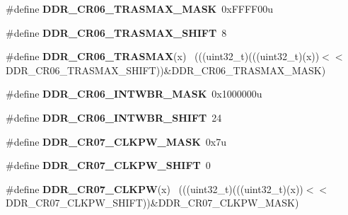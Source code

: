 \begin{DoxyCompactItemize}
\item 
\hypertarget{group___d_d_r___register___masks_ga39b9c655120cbb895150eb805896a00d}{}\#define {\bfseries D\+D\+R\+\_\+\+C\+R06\+\_\+\+T\+R\+A\+S\+M\+A\+X\+\_\+\+M\+A\+S\+K}~0x\+F\+F\+F\+F00u\label{group___d_d_r___register___masks_ga39b9c655120cbb895150eb805896a00d}

\item 
\hypertarget{group___d_d_r___register___masks_gac6c0a9be33d08dc2519b8b05fae15c8c}{}\#define {\bfseries D\+D\+R\+\_\+\+C\+R06\+\_\+\+T\+R\+A\+S\+M\+A\+X\+\_\+\+S\+H\+I\+F\+T}~8\label{group___d_d_r___register___masks_gac6c0a9be33d08dc2519b8b05fae15c8c}

\item 
\hypertarget{group___d_d_r___register___masks_gae784e3f9d431535c49759d16ac72547b}{}\#define {\bfseries D\+D\+R\+\_\+\+C\+R06\+\_\+\+T\+R\+A\+S\+M\+A\+X}(x)                                        ~(((uint32\+\_\+t)(((uint32\+\_\+t)(x))$<$$<$D\+D\+R\+\_\+\+C\+R06\+\_\+\+T\+R\+A\+S\+M\+A\+X\+\_\+\+S\+H\+I\+F\+T))\&D\+D\+R\+\_\+\+C\+R06\+\_\+\+T\+R\+A\+S\+M\+A\+X\+\_\+\+M\+A\+S\+K)\label{group___d_d_r___register___masks_gae784e3f9d431535c49759d16ac72547b}

\item 
\hypertarget{group___d_d_r___register___masks_ga278f50ecb4e932655845567a71183828}{}\#define {\bfseries D\+D\+R\+\_\+\+C\+R06\+\_\+\+I\+N\+T\+W\+B\+R\+\_\+\+M\+A\+S\+K}~0x1000000u\label{group___d_d_r___register___masks_ga278f50ecb4e932655845567a71183828}

\item 
\hypertarget{group___d_d_r___register___masks_ga9410d3b28f872240240ebe35e0097775}{}\#define {\bfseries D\+D\+R\+\_\+\+C\+R06\+\_\+\+I\+N\+T\+W\+B\+R\+\_\+\+S\+H\+I\+F\+T}~24\label{group___d_d_r___register___masks_ga9410d3b28f872240240ebe35e0097775}

\item 
\hypertarget{group___d_d_r___register___masks_ga6fc0837cfc90660bbce72e82a09aea48}{}\#define {\bfseries D\+D\+R\+\_\+\+C\+R07\+\_\+\+C\+L\+K\+P\+W\+\_\+\+M\+A\+S\+K}~0x7u\label{group___d_d_r___register___masks_ga6fc0837cfc90660bbce72e82a09aea48}

\item 
\hypertarget{group___d_d_r___register___masks_gacf2d1ab407cfead6ab0231c23bebc7af}{}\#define {\bfseries D\+D\+R\+\_\+\+C\+R07\+\_\+\+C\+L\+K\+P\+W\+\_\+\+S\+H\+I\+F\+T}~0\label{group___d_d_r___register___masks_gacf2d1ab407cfead6ab0231c23bebc7af}

\item 
\hypertarget{group___d_d_r___register___masks_ga9091c9208548ccbbaa020d6dc0387d01}{}\#define {\bfseries D\+D\+R\+\_\+\+C\+R07\+\_\+\+C\+L\+K\+P\+W}(x)                                            ~(((uint32\+\_\+t)(((uint32\+\_\+t)(x))$<$$<$D\+D\+R\+\_\+\+C\+R07\+\_\+\+C\+L\+K\+P\+W\+\_\+\+S\+H\+I\+F\+T))\&D\+D\+R\+\_\+\+C\+R07\+\_\+\+C\+L\+K\+P\+W\+\_\+\+M\+A\+S\+K)\label{group___d_d_r___register___masks_ga9091c9208548ccbbaa020d6dc0387d01}


\end{DoxyCompactItemize}
